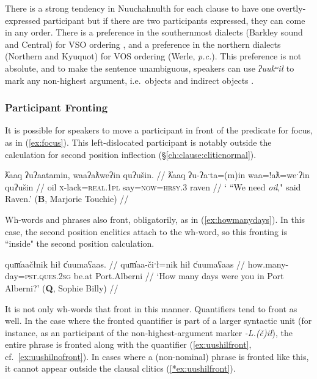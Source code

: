 
There is a strong tendency in Nuuchahnulth for each clause to have one overtly-expressed participant \citep[38]{rose1981} but if there are two participants expressed, they can come in any order. There is a preference in the southernmost dialects (Barkley sound and Central) for VSO ordering \citep[267]{jacobsen1993}, and a preference in the northern dialects (Northern and Kyuquot) for VOS ordering (Werle, \textit{p.c.}). This preference is not absolute, and to make the sentence unambiguous, speakers can use \textit{ʔuukʷił} to mark any non-highest argument, i.e.\ objects and indirect objects \citep{woo2007b}.

\subsubsection{Participant Fronting} \label{ch:clause:fronting}

It is possible for speakers to move a participant in front of the predicate for focus, as in (\ref{ex:focus}). This left-dislocated participant is notably outside the calculation for second position inflection (\S\ref{ch:clause:cliticnormal}).

\ex \label{ex:focus}
\begingl
\glpreamble ƛ̓aaq ʔuʔaatamin, waaʔaƛweʔin quʔušin. //
\gla ƛ̓aaq ʔu-ʔaˑta=(m)in waa=!aƛ=weˑʔin quʔušin //
\glb oil \textsc{x}-lack=\textsc{real.1pl} say=\textsc{now}=\textsc{hrsy.3} raven //
\glft ` ``We need \textit{oil}," said Raven.' (\textbf{B}, Marjorie Touchie) //
\endgl
\xe

Wh-words and phrases also front, obligatorily, as in (\ref{ex:howmanydays}). In this case, the second position enclitics attach to the wh-word, so this fronting is ``inside" the second position calculation.

\ex \label{ex:howmanydays}
\begingl
\glpreamble qum̓aačłnik hił c̓uumaʕaas. //
\gla qum̓aa-čiˑł=nik hił c̓uumaʕaas //
\glb how.many-day=\textsc{pst.ques.2sg} be.at Port.Alberni //
\glft `How many days were you in Port Alberni?' (\textbf{Q}, Sophie Billy) //
\endgl
\xe

It is not only wh-words that front in this manner. Quantifiers tend to front as well. In the case where the fronted quantifier is part of a larger syntactic unit (for instance, as an participant of the non-highest-argument marker \textit{-L.(č)ił}), the entire phrase is fronted along with the quantifier (\ref{ex:uushilfront}, cf.\ \ref{ex:uushilnofront}). In cases where a (non-nominal) phrase is fronted like this, it cannot appear outside the clausal clitics (\ref{*ex:uushilfront}).

